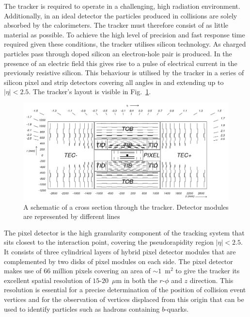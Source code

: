 The tracker is required to operate in a challenging, high radiation
environment. Additionally, in an ideal detector the particles produced
in collisions are solely absorbed by the calorimeters. The tracker
must therefore consist of as little material as possible. To achieve
the high level of precision and fast response time required given
these conditions, the tracker utilises silicon technology. As charged
particles pass through doped silicon an electron-hole pair is
produced. In the presence of an electric field this gives rise to a
pulse of electrical current in the previously resistive silicon. This
behaviour is utilised by the tracker in a series of silicon pixel and
strip detectors covering all angles in \phi and extending up to
$|\eta|<2.5$. The tracker's layout is visible in
Fig.~\ref{fig:tracker}. 

\begin{figure}
\begin{center}
\includegraphics[width=0.8\linewidth]{figs/cmstracker} \end{center}
\caption{ A schematic of a cross section through the \CMS tracker.
Detector modules are represented by different lines \cite{Chatrchyan:2008aa}}
\label{fig:tracker} \end{figure}

The pixel detector is the high granularity component of the tracking
system that sits closest to the interaction point, covering the
pseudorapidity region $|\eta|<2.5$. It consists of three cylindrical
layers of hybrid pixel detector modules that are complemented by two
disks of pixel modules on each side. The pixel detector makes use of
66 million pixels covering an area of $\sim 1$~m$^2$ to give the
tracker its excellent spatial resolution of $15$-$20$~$\mu$m in both
the $r$-$\phi$ and $z$ direction. This resolution is essential for a
precise determination of the position of collision event vertices and
for the observation of vertices displaced from this origin that can be
used to identify particles such as hadrons containing $b$-quarks.

